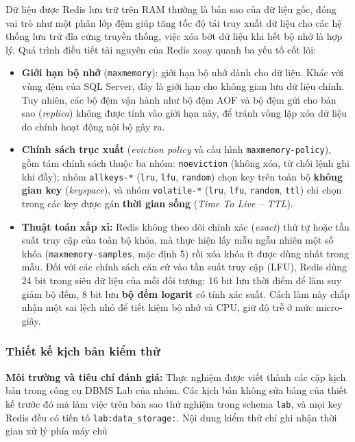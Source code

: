 Dữ liệu được Redis lưu trữ trên RAM thường là bản sao của dữ liệu gốc, đóng vai trò như một phân lớp đệm giúp tăng tốc độ tái truy xuất dữ liệu cho các hệ thống lưu trữ đĩa cứng truyền thống, việc xóa bớt dữ liệu khi hết bộ nhớ là hợp lý. Quá trình điều tiết tài nguyên của Redis xoay quanh ba yếu tố cốt lõi:
\begin{itemize}
    \item \textbf{Giới hạn bộ nhớ} (\texttt{maxmemory}): giới hạn bộ nhớ dành cho dữ liệu. Khác với vùng đệm của SQL Server, đây là giới hạn cho không gian lưu dữ liệu chính. Tuy nhiên, các bộ đệm vận hành như bộ đệm AOF và bộ đệm gửi cho bản sao (\textit{replica}) không được tính vào giới hạn này, để tránh vòng lặp xóa dữ liệu do chính hoạt động nội bộ gây ra.
    \item \textbf{Chính sách trục xuất} (\textit{eviction policy} và cấu hình \texttt{maxmemory-policy}), gồm tám chính sách thuộc ba nhóm: \texttt{noeviction} (không xóa, từ chối lệnh ghi khi đầy); nhóm \texttt{allkeys-*} (\texttt{lru}, \texttt{lfu}, \texttt{random}) chọn key trên toàn bộ \textbf{không gian key} (\textit{keyspace}), và nhóm \texttt{volatile-*} (\texttt{lru}, \texttt{lfu}, \texttt{random}, \texttt{ttl}) chỉ chọn trong các key được gán \textbf{thời gian sống} (\textit{Time To Live -- TTL}).
    \item \textbf{Thuật toán xấp xỉ:} Redis không theo dõi chính xác (\textit{exact}) thứ tự hoặc tần suất truy cập của toàn bộ khóa, mà thực hiện lấy mẫu ngẫu nhiên một số khóa (\texttt{maxmemory-samples}, mặc định 5) rồi xóa khóa ít được dùng nhất trong mẫu. Đối với các chính sách căn cứ vào tần suất truy cập (LFU), Redis dùng 24 bit trong siêu dữ liệu của mỗi đối tượng: 16 bit lưu thời điểm để làm suy giảm bộ đếm, 8 bit lưu \textbf{bộ đếm logarit} có tính xác suất. Cách làm này chấp nhận một sai lệch nhỏ để tiết kiệm bộ nhớ và CPU, giữ độ trễ ở mức micro-giây.
\end{itemize}

\subsubsection{Thiết kế kịch bản kiểm thử}
\label{subsubsec:ds-experiment}

\textbf{Môi trường và tiêu chí đánh giá:}
Thực nghiệm được viết thành các cặp kịch bản trong công cụ DBMS Lab của nhóm. Các kịch bản không sửa bảng của thiết kế trước đó mà làm việc trên bản sao thử nghiệm trong schema \texttt{lab}, và mọi key Redis đều có tiền tố \texttt{lab:data\_storage:}. Nội dung kiểm thử chỉ ghi nhận thời gian xử lý phía máy chủ

